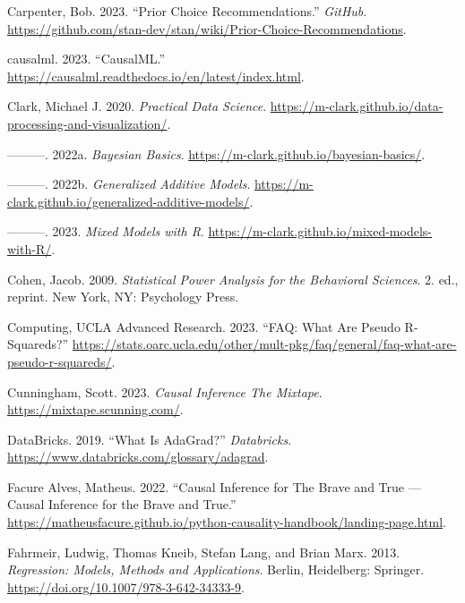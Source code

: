 \documentclass[
  letterpaper,
]{krantz}
\newlength{\cslhangindent}
\newenvironment{CSLReferences}[2] %
 {\begin{list}{}{%
  \setlength{\itemindent}{0pt}
  \setlength{\leftmargin}{0pt}
  \setlength{\parsep}{0pt}
  \ifodd #1
   \setlength{\leftmargin}{\cslhangindent}
   \setlength{\itemindent}{-1\cslhangindent}
  \fi
  \setlength{\itemsep}{#2\baselineskip}}}
 {\end{list}}
\begin{document}
\begin{CSLReferences}{1}{0}
Carpenter, Bob. 2023. {``Prior {Choice} {Recommendations}.''}
\emph{GitHub}.
\url{https://github.com/stan-dev/stan/wiki/Prior-Choice-Recommendations}.

causalml. 2023. {``{CausalML}.''}
\url{https://causalml.readthedocs.io/en/latest/index.html}.

Clark, Michael J. 2020. \emph{Practical {Data} {Science}}.
\url{https://m-clark.github.io/data-processing-and-visualization/}.

---------. 2022a. \emph{Bayesian {Basics}}.
\url{https://m-clark.github.io/bayesian-basics/}.

---------. 2022b. \emph{Generalized {Additive} {Models}}.
\url{https://m-clark.github.io/generalized-additive-models/}.

---------. 2023. \emph{Mixed {Models} with {R}}.
\url{https://m-clark.github.io/mixed-models-with-R/}.

Cohen, Jacob. 2009. \emph{Statistical Power Analysis for the Behavioral
Sciences}. 2. ed., reprint. New York, NY: Psychology Press.

Computing, UCLA Advanced Research. 2023. {``{FAQ}: {What} Are Pseudo
{R}-Squareds?''}
\url{https://stats.oarc.ucla.edu/other/mult-pkg/faq/general/faq-what-are-pseudo-r-squareds/}.

Cunningham, Scott. 2023. \emph{Causal {Inference} {The} {Mixtape}}.
\url{https://mixtape.scunning.com/}.

DataBricks. 2019. {``What Is {AdaGrad}?''} \emph{Databricks}.
\url{https://www.databricks.com/glossary/adagrad}.

Facure Alves, Matheus. 2022. {``Causal {Inference} for {The} {Brave} and
{True} --- {Causal} {Inference} for the {Brave} and {True}.''}
\url{https://matheusfacure.github.io/python-causality-handbook/landing-page.html}.

Fahrmeir, Ludwig, Thomas Kneib, Stefan Lang, and Brian Marx. 2013.
\emph{Regression: {Models}, {Methods} and {Applications}}. Berlin,
Heidelberg: Springer. \url{https://doi.org/10.1007/978-3-642-34333-9}.


\end{CSLReferences}
\end{document}
